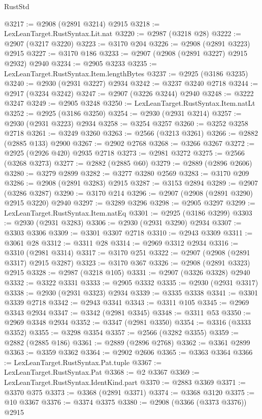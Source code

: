 \begin{lexlean}{RustStd}
\begin{coremodule}
@3217 := @2908 (@2891 @3214) @2915
@3218 := LexLeanTarget.RustSyntax.Lit.nat
@3220 := @2987 (@3218 @28)
@3222 := @2907 (@3217 @3220)
@3223 := @3170 @204
@3226 := @2908 (@2891 @3223) @2915
@3227 := @3170 @186
@3233 := @2907 (@2908 (@2891 @3227) @2915 @2932) @2940
@3234 := @2905 @3233
@3235 := LexLeanTarget.RustSyntax.Item.lengthBytes
@3237 := @2925 (@3186 @3235)
@3240 := @2930 (@2931 @3227) @2934
@3242 := @3237 @3240 @2718
@3244 := @2917 (@3234 @3242)
@3247 := @2907 (@3226 @3244) @2940
@3248 := @3222 @3247
@3249 := @2905 @3248
@3250 := LexLeanTarget.RustSyntax.Item.natLt
@3252 := @2925 (@3186 @3250)
@3254 := @2930 (@2931 @3214)
@3257 := @2930 (@2931 @3223) @2934
@3258 := @3254 @3257
@3260 := @3252 @3258 @2718
@3261 := @3249 @3260
@3263 := @2566 (@3213 @3261)
@3266 := @2882 (@2885 @133) @2900
@3267 := @2902 @2768
@3268 := @3266 @3267
@3272 := @2925 (@2926 @420) @2935 @2718
@3273 := @2981 @3272
@3275 := @2566 (@3268 @3273)
@3277 := @2882 (@2885 @60)
@3279 := @2889 (@2896 @2606)
@3280 := @3279 @2899
@3282 := @3277 @3280 @2569
@3283 := @3170 @209
@3286 := @2908 (@2891 @3283) @2915
@3287 := @3153 @2894
@3289 := @2907 (@3286 @3287)
@3290 := @3170 @214
@3296 := @2907 (@2908 (@2891 @3290) @2915 @3220) @2940
@3297 := @3289 @3296
@3298 := @2905 @3297
@3299 := LexLeanTarget.RustSyntax.Item.natEq
@3301 := @2925 (@3186 @3299)
@3303 := @2930 (@2931 @3283)
@3306 := @2930 (@2931 @3290) @2934
@3307 := @3303 @3306
@3309 := @3301 @3307 @2718
@3310 := @2943 @3309
@3311 := @3061 @28
@3312 := @3311 @28
@3314 := @2969 @3312 @2934
@3316 := @3310 (@2981 @3314)
@3317 := @3170 @251
@3322 := @2907 (@2908 (@2891 @3317) @2915 @3287)
@3323 := @3170 @367
@3326 := @2908 (@2891 @3323) @2915
@3328 := @2987 (@3218 @105)
@3331 := @2907 (@3326 @3328) @2940
@3332 := @3322 @3331
@3333 := @2905 @3332
@3335 := @2930 (@2931 @3317)
@3338 := @2930 (@2931 @3323) @2934
@3339 := @3335 @3338
@3341 := @3301 @3339 @2718
@3342 := @2943 @3341
@3343 := @3311 @105
@3345 := @2969 @3343 @2934
@3347 := @3342 (@2981 @3345)
@3348 := @3311 @53
@3350 := @2969 @3348 @2934
@3352 := @3347 (@2981 @3350)
@3354 := @3316 (@3333 @3352)
@3355 := @3298 @3354
@3357 := @2566 (@3282 @3355)
@3359 := @2882 (@2885 @186)
@3361 := @2889 (@2896 @2768)
@3362 := @3361 @2899
@3363 := @3359 @3362
@3364 := @2902 @2606
@3365 := @3363 @3364
@3366 := LexLeanTarget.RustSyntax.Pat.tuple
@3367 := LexLeanTarget.RustSyntax.Pat
@3368 := @2 @3367
@3369 := LexLeanTarget.RustSyntax.IdentKind.part
@3370 := @2883 @3369
@3371 := @3370 @375
@3373 := @3368 (@2891 @3371)
@3374 := @3368 @3120
@3375 := @10 @3367
@3376 := @3374 @3375
@3380 := @2908 (@3366 (@3373 @3376)) @2915

\end{coremodule}
\end{lexlean}
